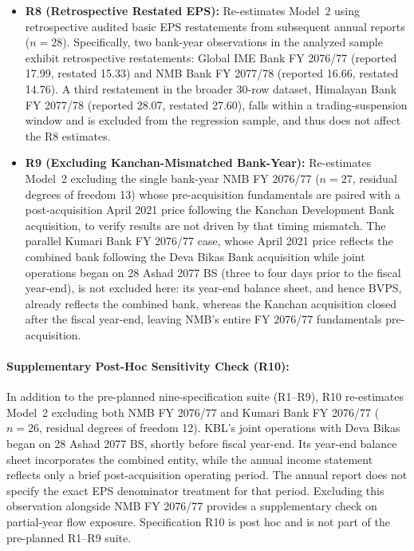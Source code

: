 \begin{itemize}
    \item \textbf{R8 (Retrospective Restated EPS):} Re-estimates Model~2 using retrospective audited basic EPS restatements from subsequent annual reports ($n = 28$). Specifically, two bank-year observations in the analyzed sample exhibit retrospective restatements: Global IME Bank FY 2076/77 (reported 17.99, restated 15.33) and NMB Bank FY 2077/78 (reported 16.66, restated 14.76). A third restatement in the broader 30-row dataset, Himalayan Bank FY 2077/78 (reported 28.07, restated 27.60), falls within a trading-suspension window and is excluded from the regression sample, and thus does not affect the R8 estimates.
    \item \textbf{R9 (Excluding Kanchan-Mismatched Bank-Year):} Re-estimates Model~2 excluding the single bank-year NMB FY 2076/77 ($n = 27$, residual degrees of freedom 13) whose pre-acquisition fundamentals are paired with a post-acquisition April 2021 price following the Kanchan Development Bank acquisition, to verify results are not driven by that timing mismatch. The parallel Kumari Bank FY 2076/77 case, whose April 2021 price reflects the combined bank following the Deva Bikas Bank acquisition while joint operations began on 28 Ashad 2077 BS (three to four days prior to the fiscal year-end), is not excluded here: its year-end balance sheet, and hence BVPS, already reflects the combined bank, whereas the Kanchan acquisition closed after the fiscal year-end, leaving NMB's entire FY 2076/77 fundamentals pre-acquisition.
\end{itemize}

\paragraph{Supplementary Post-Hoc Sensitivity Check (R10):}
In addition to the pre-planned nine-specification suite (R1--R9), R10 re-estimates Model~2 excluding both NMB FY 2076/77 and Kumari Bank FY 2076/77 ($n = 26$, residual degrees of freedom 12). KBL's joint operations with Deva Bikas began on 28 Ashad 2077 BS, shortly before fiscal year-end. Its year-end balance sheet incorporates the combined entity, while the annual income statement reflects only a brief post-acquisition operating period. The annual report does not specify the exact EPS denominator treatment for that period. Excluding this observation alongside NMB FY 2076/77 provides a supplementary check on partial-year flow exposure. Specification R10 is post hoc and is not part of the pre-planned R1--R9 suite.

